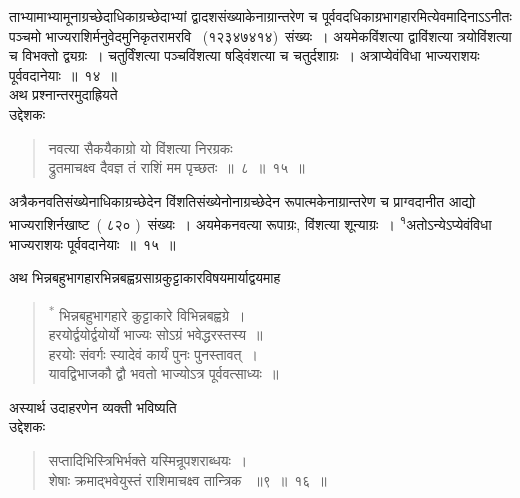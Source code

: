 \documentclass[11pt, openany]{book}
\begin{document}
       
\newpage
\thispagestyle{fancy}
\fancyhf{}
\noindent
ताभ्यामाभ्यामूनाग्रच्छेदाधिकाग्रच्छेदाभ्यां द्वादशसंख्याकेनाग्रान्तरेण च
पूर्ववदधिकाग्रभागहारमित्येवमादिनाऽऽनीतः पञ्चमो भाज्यराशिर्मनुवेदमुनिकृतरामरवि
~(१२३४७४१४)~संख्यः~। अयमेकविंशत्या द्वाविंशत्या त्रयोविंशत्या च विभक्तो द्व्यग्रः~। चतुर्विंशत्या पञ्चविंशत्या षड्विंशत्या च चतुर्दशाग्रः~। अत्राप्येवंविधा भाज्यराशयः पूर्ववदानेयाः~॥~१४~॥\\
\indent
अथ प्रश्नान्तरमुदाह्रियते\textendash \\
उद्देशकः\textendash 
\begin{quote}
{\ku
नवत्या सैकयैकाग्रो यो विंशत्या निरग्रकः~\\
द्रुतमाचक्ष्व दैवज्ञ तं राशिं मम पृच्छतः~॥~८~॥~१५~॥}
\end{quote}

\indent
अत्रैकनवतिसंख्येनाधिकाग्रच्छेदेन विंशतिसंख्येनोनाग्रच्छेदेन रूपात्मकेनाग्रान्तरेण च प्राग्वदानीत आद्यो भाज्यराशिर्नखाष्ट~( ८२० )~संख्यः~। अयमेकनवत्या रूपाग्रः, विंशत्या शून्याग्रः~। \textsuperscript{१}अतोऽन्येऽप्येवंविधा भाज्यराशयः पूर्ववदानेयाः~॥~१५~॥

\indent
अथ भिन्नबहुभागहारभिन्नबह्वग्रसाग्रकुट्टाकारविषयमार्याद्वयमाह \textendash \\
\begin{quote}
\qt
\hspace{1cm}
\textsuperscript{*} भिन्नबहुभागहारे कुट्टाकारे विभिन्नबह्वग्रे~।\\
\indent
\hspace{1cm}
हरयोर्द्वयोर्द्वयोर्यो भाज्यः सोऽग्रं भवेद्धरस्तस्य~॥\\
\indent
\hspace{1cm}
हरयोः संवर्गः स्यादेवं कार्यं पुनः पुनस्तावत्~।\\
\indent
\hspace{1cm}
यावद्विभाजकौ द्वौ भवतो भाज्योऽत्र पूर्ववत्साध्यः~॥\\
\end{quote}

\indent
अस्यार्थ उदाहरणेन व्यक्ती भविष्यति\textendash \\
उद्देशकः\textendash 
\begin{quote}
{\ku सप्तादिभिस्त्रिभिर्भक्ते यस्मिन्रूपशराब्धयः~।\\
शेषाः क्रमाद्भवेयुस्तं राशिमाचक्ष्व तान्त्रिक ~॥९~॥~१६~॥}
\end{quote}
\end{document}
